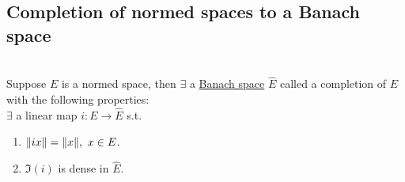 \clearpage
\subsection{Completion of normed spaces to a Banach space}
\begin{theorem}\ \\
Suppose $E$ is a normed space, then $\exists$ a \underline{Banach space} $\hat{E}$ called a completion of $E$ with the following properties:\\
$\exists$ a linear map $i: E \to \hat{E}$ s.t. 
\begin{enumerate}[label = (\alph*)]
    \item $\norm{ix} = \norm{x},\ x \in E$.
    \item $\Im(i)$ is dense in $\hat{E}$.
\end{enumerate}
\end{theorem}
